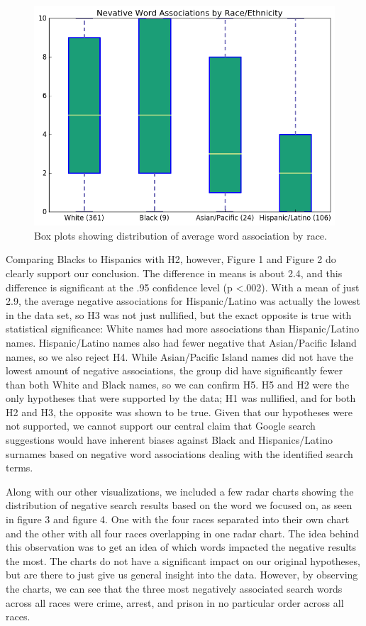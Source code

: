 \documentclass[sigconf]{acmart}
\begin{document}
\begin{figure}
\includegraphics[width=\columnwidth]{images/fig2.png}
\caption{Box plots showing distribution of average word association by race.}
\label{Figure 2}
\end{figure}

Comparing Blacks to Hispanics with H2, however, Figure 1 and Figure 2 do clearly support our conclusion. The difference in means is about 2.4, and this difference is significant at the .95 confidence level (p \textless .002). With a mean of just 2.9, the average negative associations for Hispanic/Latino was actually the lowest in the data set, so H3 was not just nullified, but the exact opposite is true with statistical significance: White names had more associations than Hispanic/Latino names. Hispanic/Latino names also had fewer negative that Asian/Pacific Island names, so we also reject H4. While Asian/Pacific Island names did not have the lowest amount of negative associations, the group did have significantly fewer than both White and Black names, so we can confirm H5. H5 and H2 were the only hypotheses that were supported by the data; H1 was nullified, and for both H2 and H3, the opposite was shown to be true. Given that our hypotheses were not supported, we cannot support our central claim that Google search suggestions would have inherent biases against Black and Hispanics/Latino surnames based on negative word associations dealing with the identified search terms.

Along with our other visualizations, we included a few radar charts showing the distribution of negative search results based on the word we focused on, as seen in figure 3 and figure 4. One with the four races separated into their own chart and the other with all four races overlapping in one radar chart. The idea behind this observation was to get an idea of which words impacted the negative results the most. The charts do not have a significant impact on our original hypotheses, but are there to just give us general insight into the data. However, by observing the charts, we can see that the three most negatively associated search words across all races were crime, arrest, and prison in no particular order across all races.
\end{document}
